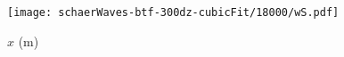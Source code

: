 \documentclass{article}
\begin{document}
\texttt{[image: schaerWaves-btf-300dz-cubicFit/18000/wS.pdf]}

\vspace{0.5em}
\hspace*{8em}$x$ (\si{\meter})
\end{document}
